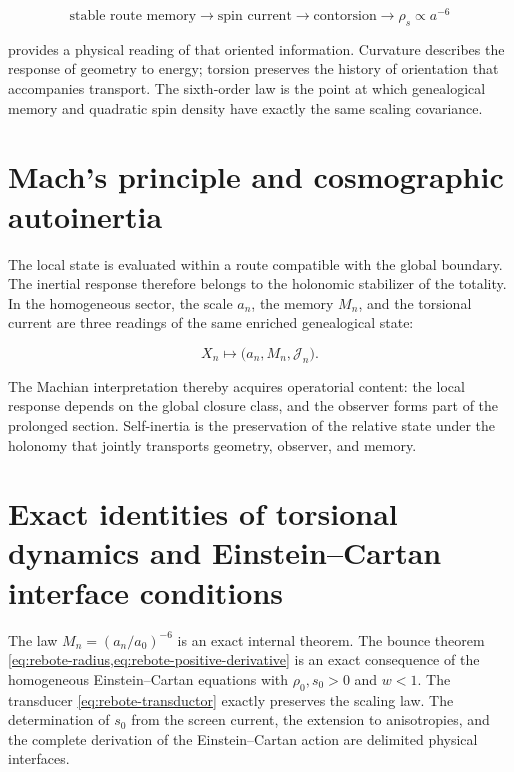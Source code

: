 \begin{equation}
 \text{stable route memory}
 \longrightarrow
 \text{spin current}
 \longrightarrow
 \text{contorsion}
 \longrightarrow
 \rho_s\propto a^{-6}
 \label{eq:rebote-genealogy}
\end{equation}

provides a physical reading of that oriented information. Curvature
describes the response of geometry to energy; torsion preserves
the history of orientation that accompanies transport. The sixth-order
law is the point at which genealogical memory and quadratic spin
density have exactly the same scaling covariance.

\section{Mach's principle and cosmographic autoinertia}

The local state is evaluated within a route compatible with the global
boundary. The inertial response therefore belongs to the holonomic
stabilizer of the totality. In the homogeneous sector, the scale \(a_n\), the
memory \(M_n\), and the torsional current are three readings of the same enriched
genealogical state:

\begin{equation}
 X_n\longmapsto
 \bigl(a_n,M_n,\mathcal J_n\bigr).
 \label{eq:rebote-mach-triple}
\end{equation}

The Machian interpretation thereby acquires operatorial content: the local response depends on the global closure class, and the observer forms part of the prolonged section. Self-inertia is the preservation of the relative state under the holonomy that jointly transports geometry, observer, and memory.

\section{Exact identities of torsional dynamics and Einstein–Cartan interface conditions}

\begin{proofstatusbox}
The law \(M_n=(a_n/a_0)^{-6}\) is an exact internal theorem. The bounce theorem \cref{eq:rebote-radius,eq:rebote-positive-derivative} is an exact consequence of the homogeneous Einstein--Cartan equations \cite{Hehl1976} with \(\rho_0,s_0>0\) and \(w<1\). The transducer \cref{eq:rebote-transductor} exactly preserves the scaling law. The determination of \(s_0\) from the screen current, the extension to anisotropies, and the complete derivation of the Einstein--Cartan action are delimited physical interfaces.
\end{proofstatusbox}

